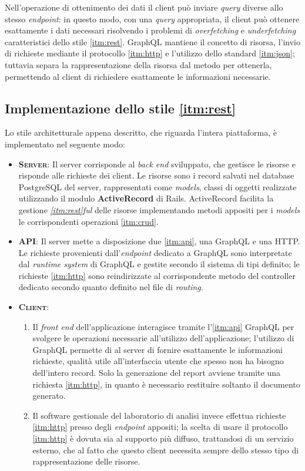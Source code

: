 Nell'operazione di ottenimento dei dati il client può inviare \textit{query} diverse allo stesso \textit{endpoint}: in questo modo, con una \textit{query} appropriata, il client può ottenere esattamente i dati necessari risolvendo i problemi di \textit{overfetching} e \textit{underfetching} caratteristici dello stile \ref{itm:rest}. GraphQL mantiene il concetto di risorsa, l'invio di richieste mediante il protocollo \ref{itm:http} e l'utilizzo dello standard \ref{itm:json}; tuttavia separa la rappresentazione della risorsa dal metodo per ottenerla, permettendo al client di richiedere esattamente le informazioni necessarie.

\subsection{Implementazione dello stile \ref{itm:rest}}
Lo stile architetturale appena descritto, che riguarda l'intera piattaforma, è implementato  nel seguente modo:
\begin{itemize}
    \item \textsc{\textbf{Server}}: Il server corrisponde al \textit{back end} sviluppato, che gestisce le risorse e risponde alle richieste dei client. Le risorse sono i record salvati nel database PostgreSQL del server, rappresentati come \textit{models}, classi di oggetti realizzate utilizzando il modulo \textbf{ActiveRecord} di Rails. ActiveRecord facilita la gestione \textit{\ref{itm:rest}ful} delle risorse implementando metodi appositi per i \textit{models} le corrispondenti operazioni \ref{itm:crud}.
    \item \textsc{\textbf{API}}: Il server mette a disposizione due \ref{itm:api}, una GraphQL e una HTTP. Le richieste provenienti dall'\textit{endpoint} dedicato a GraphQL sono interpretate dal \textit{runtime system} di GraphQL e gestite secondo il sistema di tipi definito; le richieste \ref{itm:http} sono reindirizzate al corrispondente metodo del controller dedicato secondo quanto definito nel file di \textit{routing}.
    \item \textsc{\textbf{Client}}: 
    \begin{enumerate}
        \item Il \textit{front end} dell'applicazione interagisce tramite l'\ref{itm:api} GraphQL per svolgere le operazioni necessarie all'utilizzo dell'applicazione; l'utilizzo di GraphQL permette di al server di fornire esattamente le informazioni richieste, qualità utile all'interfaccia utente che spesso non ha bisogno dell'intero record. Solo la generazione del report avviene tramite una richiesta \ref{itm:http}, in quanto è necessario restituire soltanto il documento generato.
        \item Il software gestionale del laboratorio di analisi invece effettua richieste \ref{itm:http} presso degli \textit{endpoint} appositi; la scelta di usare il protocollo \ref{itm:http} è dovuta sia al supporto più diffuso, trattandosi di un servizio esterno, che al fatto che questo client necessita sempre dello stesso tipo di rappresentazione delle risorse. 
    \end{enumerate} 
\end{itemize}
\vspace{-20pt}
